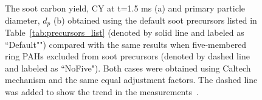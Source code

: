 \begin{figure}[H]
	\centering
	\caption{The soot carbon yield, CY at t=1.5 ms (a) and primary particle diameter, $d_p$ (b) obtained using the default soot precursors listed in Table~\ref{tab:precursors_list} (denoted by solid line and labeled as ``Default"") compared with the same results when five-membered ring PAHs  excluded from soot precursors (denoted by dashed line and labeled as ``NoFive"). Both cases were obtained using Caltech mechanism and the same equal adjustment factors. The dashed line was added to show the trend in the measurements~\citep{agafonov2016unified}.}
	\label{fig:shockagof_yieldspc_cpr} 
\end{figure}


